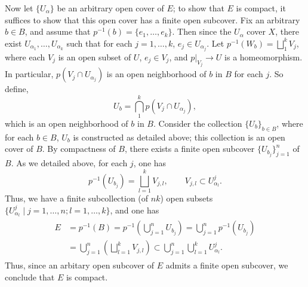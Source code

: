 \documentclass{article}
\begin{document}
	Now let $\{U_{\alpha}\}$ be an arbitrary open cover of $E$; to show that $E$ is compact, it suffices to show that this open cover has a finite open subcover. Fix an arbitrary $b \in B$, and assume that $p^{-1}(b) = \{e_{1}, \ldots, e_{k}\}$. Then since the $U_{\alpha}$ cover $X$, there exist $U_{\alpha_{1}}, \ldots, U_{\alpha_{k}}$ such that for each $j = 1, \ldots, k$, $e_{j} \in U_{\alpha_{j}}$. Let $p^{-1}(W_{b}) = \bigsqcup_{1}^{k}V_{j}$, where each $V_{j}$ is an open subset of $U$, $e_{j} \in V_{j}$, and $p|_{V_{j}} \to U$ is a homeomorphism. In particular, $p(V_{j} \cap U_{\alpha_{j}})$ is an open neighborhood of $b$ in $B$ for each $j$. So define, 
	\begin{equation*}
		U_{b} = \bigcap_{1}^{k}p(V_{j} \cap U_{\alpha_{j}}),
	\end{equation*}
	which is an open neighborhood of $b$ in $B$. Consider the collection $\{U_{b}\}_{b \in B}$, where for each $b \in B$, $U_{b}$ is constructed as detailed above; this collection is an open cover of $B$. By compactness of $B$, there exists a finite open subcover $\{U_{b_{j}}\}_{j = 1}^{n}$ of $B$. As we detailed above, for each $j$, one has 
	\begin{equation*}
		p^{-1}(U_{b_{j}}) = \bigsqcup_{l = 1}^{k}V_{j,l}, \qquad V_{j,l} \subset U_{\alpha_{l}}^{j}. 
	\end{equation*} 
	Thus, we have a finite subcollection (of $nk$) open subsets $\{U^j_{\alpha_l}\mid j = 1, \ldots, n; l = 1, \ldots, k\}$, and one has 
	\begin{align*}
		\begin{split}
			E &= p^{-1}(B) = p^{-1}\left(\bigcup_{j = 1}^{n}U_{b_{j}}\right) = \bigcup_{j = 1}^{n}p^{-1}(U_{b_{j}}) \\
			&= \bigcup_{j = 1}^{n}\left(\bigsqcup_{l = 1}^{k}V_{j,l}\right) \subset \bigcup_{j = 1}^{n}\bigcup_{l = 1}^{k}U^{j}_{\alpha_{l}}. 
		\end{split}
	\end{align*}
	Thus, since an arbitary open subcover of $E$ admits a finite open subcover, we conclude that $E$ is compact. 
	
\end{document}
